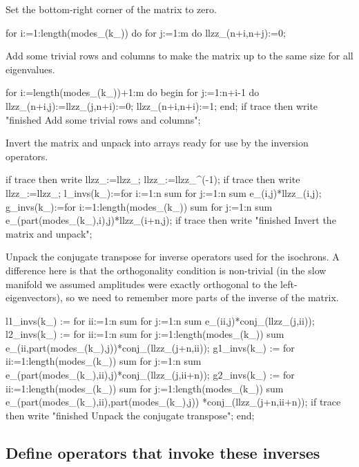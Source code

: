 \documentclass[11pt,a5paper]{article}
\begin{document}
Set the bottom-right corner of the matrix to zero.
\begin{reduce}
  for i:=1:length(modes_(k_)) do 
    for j:=1:m do llzz_(n+i,n+j):=0;
\end{reduce}

Add some trivial rows and columns to make the matrix up to
the same size for all eigenvalues.
\begin{reduce}
  for i:=length(modes_(k_))+1:m do begin 
    for j:=1:n+i-1 do llzz_(n+i,j):=llzz_(j,n+i):=0;
    llzz_(n+i,n+i):=1;
  end;
  if trace then write 
  "finished Add some trivial rows and columns";
\end{reduce}

Invert the matrix and unpack into arrays ready for use by
the inversion operators.
\begin{reduce}
  if trace then write llzz_:=llzz_; 
  llzz_:=llzz_^(-1);
  if trace then write llzz_:=llzz_;
  l_invs(k_):=for i:=1:n sum for j:=1:n sum e_(i,j)*llzz_(i,j);
  g_invs(k_):=for i:=1:length(modes_(k_)) sum 
    for j:=1:n sum e_(part(modes_(k_),i),j)*llzz_(i+n,j);
  if trace then write "finished Invert the matrix and unpack";
\end{reduce}

Unpack the conjugate transpose for inverse operators used
for the isochrons. A difference here is that the
orthogonality condition is non-trivial (in the slow manifold
we assumed amplitudes were exactly orthogonal to the
left-eigenvectors), so we need to remember more parts of the
inverse of the matrix.  
\begin{reduce}
  l1_invs(k_) := for ii:=1:n sum for j:=1:n sum 
      e_(ii,j)*conj_(llzz_(j,ii));
  l2_invs(k_) := for ii:=1:n sum 
      for j:=1:length(modes_(k_)) sum 
          e_(ii,part(modes_(k_),j))*conj_(llzz_(j+n,ii));
  g1_invs(k_) := for ii:=1:length(modes_(k_)) sum 
      for j:=1:n sum 
          e_(part(modes_(k_),ii),j)*conj_(llzz_(j,ii+n));
  g2_invs(k_) := for ii:=1:length(modes_(k_)) sum 
      for j:=1:length(modes_(k_)) sum 
          e_(part(modes_(k_),ii),part(modes_(k_),j))
          *conj_(llzz_(j+n,ii+n));
  if trace then write 
  "finished Unpack the conjugate transpose";
end;
\end{reduce}



\subsection{Define operators that invoke these inverses}
\end{document}
